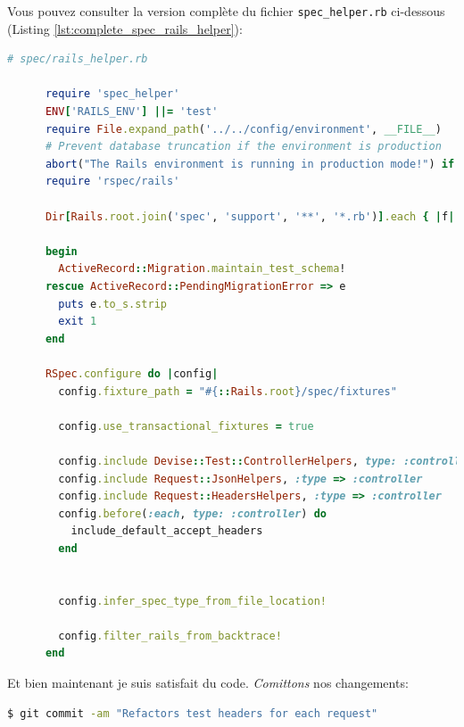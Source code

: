 \documentclass[]{report}
\begin{document}
    Vous pouvez consulter la version complète du fichier \verb|spec_helper.rb| ci-dessous (Listing \ref{lst:complete_spec_rails_helper}):

    \begin{scriptsize}
      \begin{lstlisting}[language=ruby, caption={La version complète de la configuration de Rspec après la factorisation}, label={lst:complete_spec_rails_helper}]
      # spec/rails_helper.rb

      require 'spec_helper'
      ENV['RAILS_ENV'] ||= 'test'
      require File.expand_path('../../config/environment', __FILE__)
      # Prevent database truncation if the environment is production
      abort("The Rails environment is running in production mode!") if Rails.env.production?
      require 'rspec/rails'

      Dir[Rails.root.join('spec', 'support', '**', '*.rb')].each { |f| require f }

      begin
        ActiveRecord::Migration.maintain_test_schema!
      rescue ActiveRecord::PendingMigrationError => e
        puts e.to_s.strip
        exit 1
      end

      RSpec.configure do |config|
        config.fixture_path = "#{::Rails.root}/spec/fixtures"

        config.use_transactional_fixtures = true

        config.include Devise::Test::ControllerHelpers, type: :controller
        config.include Request::JsonHelpers, :type => :controller
        config.include Request::HeadersHelpers, :type => :controller
        config.before(:each, type: :controller) do
          include_default_accept_headers
        end


        config.infer_spec_type_from_file_location!

        config.filter_rails_from_backtrace!
      end
      \end{lstlisting}
    \end{scriptsize}

    Et bien maintenant je suis satisfait du code. \textit{Comittons} nos changements:

    \begin{scriptsize}
      \begin{lstlisting}[language=bash]
      $ git commit -am "Refactors test headers for each request"
      \end{lstlisting}
    \end{scriptsize}
\end{document}
